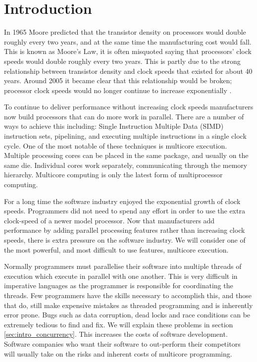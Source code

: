 %
%
\chapter{Introduction}
\label{chap:intro}

    
In 1965 Moore \citep{moore} predicted that the transistor 
density on processors would double roughly every two years,
and at the same time the manufacturing cost would fall.
This is known as Moore's Law,
it is often misquoted saying that processors' clock speeds would double
roughly every two years.
This is partly due to the strong relationship between transistor density and
clock speeds that existed for about 40 years.
Around 2005 it became clear that this relationship would be broken;
processor clock speeds would no longer continue to increase
exponentially \citep{free_lunch}.

To continue to deliver performance without increasing clock speeds
manufacturers now build processors that can do more work in parallel.
There are a number of ways to achieve this including:
Single Instruction Multiple Data (SIMD) instruction sets,
pipelining,
and executing multiple instructions in a single clock cycle.
One of the most notable of these techniques is multicore execution.
Multiple processing cores can be placed in the same package,
and usually on the same die.
Individual cores work separately, communicating through the memory
hierarchy.
Multicore computing is only the latest form of multiprocessor computing.

For a long time the software industry enjoyed the exponential growth of
clock speeds.
Programmers did not need to spend any effort in order to use the extra
clock-speed of a newer model processor.
Now that manufacturers add performance by adding parallel processing
features rather than increasing clock speeds,
there is extra pressure on the software industry.
We will consider one of the most powerful,
and most difficult to use features, multicore execution.

Normally programmers must parallelise their software into multiple
threads of execution which execute in parallel with one another.
This is very difficult in imperative languages as the programmer is
responsible for coordinating the threads.
Few programmers have the skills necessary to accomplish this,
and those that do, still make expensive mistakes as
threaded programming and is inherently error prone. 
Bugs such as data corruption, dead locks and race conditions
can be extremely tedious to find and fix.
We will explain these problems in section \ref{sec:intro_concurrency}.
This increases the costs of software development.
Software companies who want their software to out-perform their competitors
will usually take on the risks and inherent costs of multicore programming.


